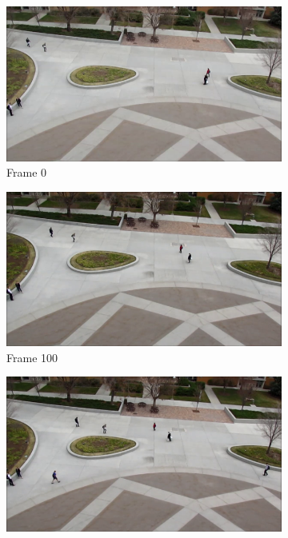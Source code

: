 \documentclass[hidelinks]{article}
\begin{document}
\begin{figure}[h]
  \centering
  \begin{subfigure}{0.49\textwidth}
    \centering
    \includegraphics[width=\textwidth]{frame_0}
    \caption{Frame 0}
  \end{subfigure}
  \begin{subfigure}{0.49\textwidth}
    \centering
    \includegraphics[width=\textwidth]{frame_100}
    \caption{Frame 100}
  \end{subfigure}
  \begin{subfigure}{0.49\textwidth}
    \centering
    \includegraphics[width=\textwidth]{frame_200}

\end{subfigure}
\end{figure}
\end{document}
